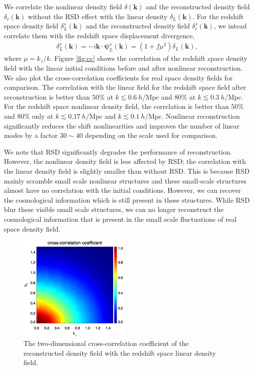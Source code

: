 \documentclass[aps,prx,twocolumn,superscriptaddress,groupedaddress,nofootinbib,amsfont]{revtex4}  %
\newcommand{\mr}{\mathrm}
\newcommand{\bea}{\begin{eqnarray}}
\newcommand{\eea}{\end{eqnarray}}
\newcommand{\bmp}{\bm{\psi}}
\newcommand{\bmk}{\bm{k}}
\begin{document}
We correlate the nonlinear density field $\delta(\bmk)$ and the reconstructed 
density field $\delta_r(\bmk)$ without the RSD effect with the linear density 
$\delta_L(\bmk)$.
For the redshift space density field $\delta_L^s(\bmk)$ and the reconstructed
density field $\delta_r^s(\bmk)$, we intead correlate them with the redshift 
space displacement divergence,
\bea
\delta^s_L(\bmk)=-i\bmk\cdot\bmp^s_L(\bmk)=(1+f\mu^2)\delta_L(\bmk),
\eea
where $\mu=k_z/k$.
Figure \ref{fig:cc} shows the correlation of the redshift space density field 
with the linear initial conditions before and after nonlinear reconstruction.
We also plot the cross-correlation coefficients for real space density fields
for comparison. 
The correlation with the linear field for the redshift space field after 
reconstruction is better than $50\%$ at $k\lesssim0.6\ h/\mr{Mpc}$ and $80\%$
at $k\lesssim0.3\ h/\mr{Mpc}$. For the redshift space nonlinear density field, 
the correlation is better than $50\%$ and $80\%$ only at $k\lesssim0.17\ h/\mr{Mpc}$ and $k\lesssim0.1\ h/\mr{Mpc}$.
Nonlinear reconstruction significantly reduces the shift nonlinearities and 
improves the number of linear modes by a factor $30\sim40$ depending on the 
scale used for comparison.

We note that RSD significantly degrades the performance of reconstruction.
However, the nonlinear density field is less affected by RSD; the correlation
with the linear density field is slightly smaller than without RSD.
This is because RSD mainly scramble small scale nonlinear structures and these 
small-scale structures almost have no correlation with the initial conditions.
However, we can recover the cosmological information which is still present in 
these structures. While RSD blur these visible small scale structures, we can  
no longer reconstruct the cosmological information that is present in the small
scale fluctuations of real space density field.

\begin{figure}[tbp]
\begin{center}
\includegraphics[width=0.48\textwidth]{0.000anixcc_deltaRsxLs_4x.eps}
\end{center}
\vspace{-0.7cm}
\caption{The two-dimensional cross-correlation coefficient of the reconstructed
density field with the redshift space linear density field.}
\label{fig:cc_Ls}
\end{figure}
\end{document}
